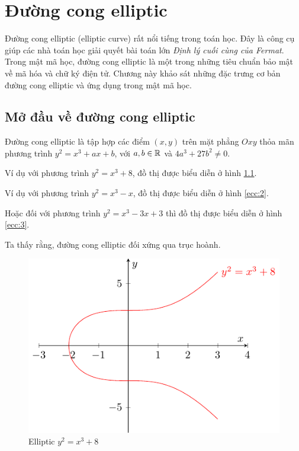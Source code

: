 \chapter{Đường cong elliptic}

Đường cong elliptic (elliptic curve) rất nổi tiếng trong toán học. Đây là
công cụ giúp các nhà toán học giải quyết bài toán lớn \textit{Định lý 
cuối cùng của Fermat}. Trong mật mã học, đường cong elliptic là một
trong những tiêu chuẩn bảo mật về mã hóa và chữ ký điện tử. Chương này 
khảo sát những đặc trưng cơ bản đường cong elliptic và ứng dụng trong
mật mã học.

\section{Mở đầu về đường cong elliptic}

Đường cong elliptic là tập hợp các điểm $(x, y)$ trên mặt phẳng $Oxy$
thỏa mãn phương trình $y^2 = x^3 + ax + b$, với $a, b \in \mathbb{R}$ và
$4a^3 + 27b^2 \neq 0$.

Ví dụ với phương trình $y^2 = x^3 + 8$, đồ thị được biểu diễn 
ở hình \ref{ecc:1}.

Ví dụ với phương trình $y^2 = x^3 - x$, đồ thị được biểu diễn
ở hình \ref{ecc:2}.

Hoặc đối với phương trình $y^2 = x^3 - 3x + 3$ thì đồ thị được biểu diễn
ở hình \ref{ecc:3}.

Ta thấy rằng, đường cong elliptic đối xứng qua trục hoành.

\begin{figure}[ht]
    \centering
    \includegraphics{../pics/ecc/ecc1.pdf}
    \caption{Elliptic $y^2 = x^3 + 8$}
    \label{ecc:1}
\end{figure}

